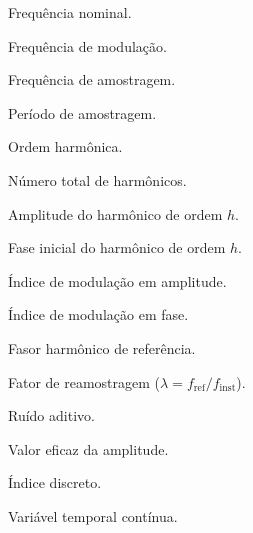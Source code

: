 
\begin{simbolos} %
	
\item[$f_0$] Frequência nominal.
\item[$f_m$] Frequência de modulação.
\item[$F_s$] Frequência de amostragem.
\item[$T_s$] Período de amostragem.
\item[$h$] Ordem harmônica.
\item[$H$] Número total de harmônicos.
\item[$A_h$] Amplitude do harmônico de ordem $h$.
\item[$\phi_{0h}$] Fase inicial do harmônico de ordem $h$.
\item[$k_x$] Índice de modulação em amplitude.
\item[$k_a$] Índice de modulação em fase.
\item[$ X_{h[n]} $] Fasor harmônico de referência.
\item[$\lambda$] Fator de reamostragem ($\lambda = f_{\text{ref}}/f_{\text{inst}}$).
\item[\ensuremath{\nu[n]}] Ruído aditivo.
\item[$A_{\mathrm{RMS}}$] Valor eficaz da amplitude.
\item[$n$] Índice discreto.
\item[$t$] Variável temporal contínua.

\end{simbolos}





